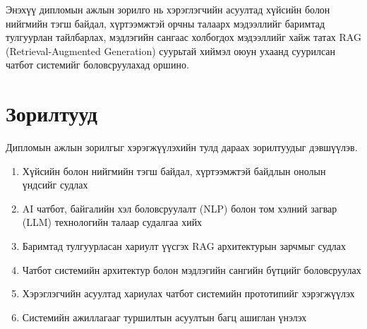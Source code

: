 Энэхүү дипломын ажлын зорилго нь хэрэглэгчийн асуултад хүйсийн болон нийгмийн тэгш байдал, хүртээмжтэй орчны талаарх мэдээллийг баримтад тулгуурлан тайлбарлах, мэдлэгийн сангаас холбогдох мэдээллийг хайж татах RAG (Retrieval-Augmented Generation) суурьтай хиймэл оюун ухаанд суурилсан чатбот системийг боловсруулахад оршино.

\section*{Зорилтууд}

Дипломын ажлын зорилгыг хэрэгжүүлэхийн тулд дараах зорилтуудыг дэвшүүлэв.

\begin{enumerate}

\item Хүйсийн болон нийгмийн тэгш байдал, хүртээмжтэй байдлын онолын үндсийг судлах

\item AI чатбот, байгалийн хэл боловсруулалт (NLP) болон том хэлний загвар (LLM) технологийн талаар судалгаа хийх

\item Баримтад тулгуурласан хариулт үүсгэх RAG архитектурын зарчмыг судлах

\item Чатбот системийн архитектур болон мэдлэгийн сангийн бүтцийг боловсруулах

\item Хэрэглэгчийн асуултад хариулах чатбот системийн прототипийг хэрэгжүүлэх

\item Системийн ажиллагааг туршилтын асуултын багц ашиглан үнэлэх

\end{enumerate}
